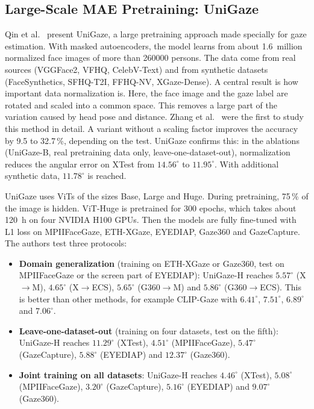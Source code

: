 \subsection{Large-Scale MAE Pretraining: UniGaze}
\label{subsec:unigaze}
Qin et al.~\cite{qin2026unigaze} present UniGaze, a large pretraining approach
made specially for gaze estimation. With masked autoencoders, the model learns
from about 1.6~million normalized face images of more than \num{260000}
persons. The data come from real sources (VGGFace2, VFHQ, CelebV-Text) and from
synthetic datasets (FaceSynthetics, SFHQ-T2I, FFHQ-NV, XGaze-Dense). A central
result is how important data normalization is. Here, the face image and the
gaze label are rotated and scaled into a common space. This removes a large
part of the variation caused by head pose and distance. Zhang et
al.~\cite{zhang2018normalization} were the first to study this method in
detail. A variant without a scaling factor improves the accuracy by 9.5 to
32.7\,\%, depending on the test. UniGaze confirms this: in the ablations
(UniGaze-B, real pretraining data only, leave-one-dataset-out), normalization
reduces the angular error on XTest from $14.56^\circ$ to $11.95^\circ$. With
additional synthetic data, $11.78^\circ$ is reached.

UniGaze uses ViTs of the sizes Base, Large and Huge. During pretraining, 75\,\%
of the image is hidden. ViT-Huge is pretrained for 300 epochs, which takes
about \SI{120}{\hour} on four NVIDIA H100 GPUs. Then the models are fully
fine-tuned with L1 loss on MPIIFaceGaze, ETH-XGaze, EYEDIAP, Gaze360 and
GazeCapture. The authors test three protocols:
\begin{itemize}
  \item \textbf{Domain generalization} (training on ETH-XGaze or Gaze360, test
        on MPIIFaceGaze or the screen part of EYEDIAP): UniGaze-H reaches
        $5.57^\circ$ (X$\rightarrow$M), $4.65^\circ$ (X$\rightarrow$ECS),
        $5.65^\circ$ (G360$\rightarrow$M) and $5.86^\circ$
        (G360$\rightarrow$ECS). This is better than other methods, for example
        CLIP-Gaze with $6.41^\circ$, $7.51^\circ$, $6.89^\circ$ and
        $7.06^\circ$.
  \item \textbf{Leave-one-dataset-out} (training on four datasets, test on the
        fifth): UniGaze-H reaches $11.29^\circ$ (XTest), $4.51^\circ$
        (MPIIFaceGaze), $5.47^\circ$ (GazeCapture), $5.88^\circ$ (EYEDIAP) and
        $12.37^\circ$ (Gaze360).
  \item \textbf{Joint training on all datasets}: UniGaze-H reaches
        $4.46^\circ$ (XTest), $5.08^\circ$ (MPIIFaceGaze), $3.20^\circ$
        (GazeCapture), $5.16^\circ$ (EYEDIAP) and $9.07^\circ$ (Gaze360).
\end{itemize}

